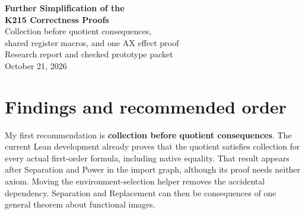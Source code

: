 \documentclass[11pt,letterpaper]{article}
\newcommand{\code}[1]{\texttt{\detokenize{#1}}}
\begin{document}
\begin{center}
{\LARGE\bfseries\color{ink}Further Simplification of the\\[4pt] K215 Correctness Proofs}\\[10pt]
{\large Collection before quotient consequences,\\
shared register macros, and one AX effect proof}\\[10pt]
{\normalsize Research report and checked prototype packet}\\[4pt]
October 21, 2026
\end{center}

\begin{abstract}
The next useful simplification is to change which results are proved once.
For Lean, transport the complete formula-indexed collection schema into the
bisimulation quotient first, and derive Separation and Replacement there using
ordinary equality. For Rocq, share unchanged register-machine macro proofs
through a checked finite program slice. A third opportunity is to share the
checked AX word interpreter and its effect proof: the actual 215 and 217 AX
words differ semantically by one adjacent commuting pair.

These recommendations are supported by newly compiled components against the
pinned repository. The Lean quotient consequences reproduce the exact existing
public theorem types. The Rocq slice theorem is bound to the literal three
program DAGs and independently checked with \code{coqchk}. The AX comparison
proves equality of the complete maintained abstract effects for every register
record. This packet is an additive proposal; it does not report a newly
rebuilt machine-to-ZFC endpoint or a measured net production-source reduction.
\end{abstract}

\section{Findings and recommended order}

My first recommendation is \textbf{collection before quotient consequences}.
The current Lean development already proves that the quotient satisfies
collection for every actual first-order formula, including native equality.
That result appears after Separation and Power in the import graph, although
its proof needs neither axiom. Moving the environment-selection helper removes
the accidental dependency. Separation and Replacement can then be consequences
of one general theorem about functional images.
\end{document}
